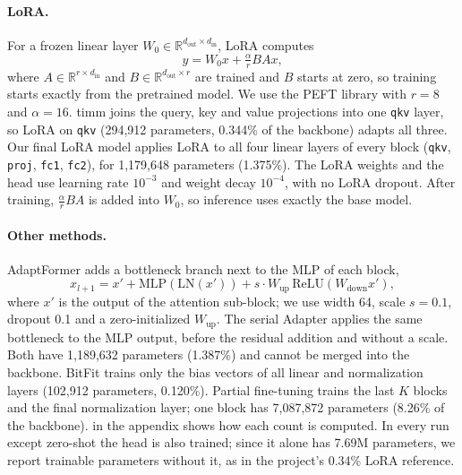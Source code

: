 \paragraph{LoRA.}
For a frozen linear layer $W_0 \in \mathbb{R}^{d_\text{out} \times d_\text{in}}$, LoRA \citep{hu2022lora} computes
\begin{equation}
  y = W_0 x + \tfrac{\alpha}{r} B A x,
  \label{eq:lora}
\end{equation}
where $A \in \mathbb{R}^{r \times d_\text{in}}$ and $B \in \mathbb{R}^{d_\text{out} \times r}$ are trained and $B$ starts at zero, so training starts exactly from the pretrained model.
We use the PEFT library \citep{mangrulkar2022peft} with $r = 8$ and $\alpha = 16$.
timm joins the query, key and value projections into one \texttt{qkv} layer, so LoRA on \texttt{qkv} (294,912 parameters, 0.344\% of the backbone) adapts all three.
Our final LoRA model applies LoRA to all four linear layers of every block (\texttt{qkv}, \texttt{proj}, \texttt{fc1}, \texttt{fc2}), for 1,179,648 parameters (1.375\%).
The LoRA weights and the head use learning rate $10^{-3}$ and weight decay $10^{-4}$, with no LoRA dropout.
After training, $\tfrac{\alpha}{r}BA$ is added into $W_0$, so inference uses exactly the base model.

\paragraph{Other methods.}
AdaptFormer \citep{chen2022adaptformer} adds a bottleneck branch next to the MLP of each block,
\begin{equation}
  x_{l+1} = x' + \mathrm{MLP}(\mathrm{LN}(x')) + s \cdot W_\text{up}\,\mathrm{ReLU}(W_\text{down} x'),
  \label{eq:adaptformer}
\end{equation}
where $x'$ is the output of the attention sub-block; we use width 64, scale $s = 0.1$, dropout 0.1 and a zero-initialized $W_\text{up}$.
The serial Adapter \citep{houlsby2019adapter} applies the same bottleneck to the MLP output, before the residual addition and without a scale.
Both have 1,189,632 parameters (1.387\%) and cannot be merged into the backbone.
BitFit \citep{benzaken2022bitfit} trains only the bias vectors of all linear and normalization layers (102,912 parameters, 0.120\%).
Partial fine-tuning trains the last $K$ blocks and the final normalization layer; one block has 7,087,872 parameters (8.26\% of the backbone).
 in the appendix shows how each count is computed.
In every run except zero-shot the head is also trained; since it alone has 7.69M parameters, we report trainable parameters without it, as in the project's 0.34\% LoRA reference.
